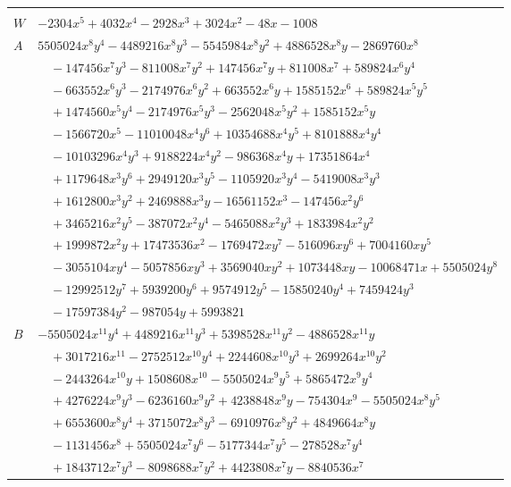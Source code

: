 \documentclass[11pt]{article}
\begin{document}
\begin{longtable}{@{}ll@{}}
\addlinespace[3pt]
\multicolumn{2}{@{}l}{$i=40$, $m=48$, neighbours $4,5,6,11,13,17,30,34,38,39$}\\
$W$ & $-2304x^{5}+4032x^{4}-2928x^{3}+3024x^{2}-48x-1008$\\
$A$ & $5505024x^{8}y^{4}-4489216x^{8}y^{3}-5545984x^{8}y^{2}+4886528x^{8}y-2869760x^{8}$\\
 & $\quad -147456x^{7}y^{3}-811008x^{7}y^{2}+147456x^{7}y+811008x^{7}+589824x^{6}y^{4}$\\
 & $\quad -663552x^{6}y^{3}-2174976x^{6}y^{2}+663552x^{6}y+1585152x^{6}+589824x^{5}y^{5}$\\
 & $\quad +1474560x^{5}y^{4}-2174976x^{5}y^{3}-2562048x^{5}y^{2}+1585152x^{5}y$\\
 & $\quad -1566720x^{5}-11010048x^{4}y^{6}+10354688x^{4}y^{5}+8101888x^{4}y^{4}$\\
 & $\quad -10103296x^{4}y^{3}+9188224x^{4}y^{2}-986368x^{4}y+17351864x^{4}$\\
 & $\quad +1179648x^{3}y^{6}+2949120x^{3}y^{5}-1105920x^{3}y^{4}-5419008x^{3}y^{3}$\\
 & $\quad +1612800x^{3}y^{2}+2469888x^{3}y-16561152x^{3}-147456x^{2}y^{6}$\\
 & $\quad +3465216x^{2}y^{5}-387072x^{2}y^{4}-5465088x^{2}y^{3}+1833984x^{2}y^{2}$\\
 & $\quad +1999872x^{2}y+17473536x^{2}-1769472xy^{7}-516096xy^{6}+7004160xy^{5}$\\
 & $\quad -3055104xy^{4}-5057856xy^{3}+3569040xy^{2}+1073448xy-10068471x+5505024y^{8}$\\
 & $\quad -12992512y^{7}+5939200y^{6}+9574912y^{5}-15850240y^{4}+7459424y^{3}$\\
 & $\quad -17597384y^{2}-987054y+5993821$\\
$B$ & $-5505024x^{11}y^{4}+4489216x^{11}y^{3}+5398528x^{11}y^{2}-4886528x^{11}y$\\
 & $\quad +3017216x^{11}-2752512x^{10}y^{4}+2244608x^{10}y^{3}+2699264x^{10}y^{2}$\\
 & $\quad -2443264x^{10}y+1508608x^{10}-5505024x^{9}y^{5}+5865472x^{9}y^{4}$\\
 & $\quad +4276224x^{9}y^{3}-6236160x^{9}y^{2}+4238848x^{9}y-754304x^{9}-5505024x^{8}y^{5}$\\
 & $\quad +6553600x^{8}y^{4}+3715072x^{8}y^{3}-6910976x^{8}y^{2}+4849664x^{8}y$\\
 & $\quad -1131456x^{8}+5505024x^{7}y^{6}-5177344x^{7}y^{5}-278528x^{7}y^{4}$\\
 & $\quad +1843712x^{7}y^{3}-8098688x^{7}y^{2}+4423808x^{7}y-8840536x^{7}$\\

\end{longtable}
\end{document}
